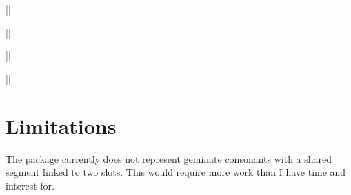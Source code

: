 \documentclass[11pt]{article}
\begin{document}
\begin{multicols}{2}
||


||

\end{multicols}
\xslotfalse
\begin{multicols}{2}

||


||

\end{multicols}

\section{Limitations}
The package currently does not represent geminate consonants with a shared segment linked to two slots.  This would require more work than I have time and interest for.
\end{document}
